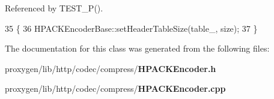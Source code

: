 Referenced by T\+E\+S\+T\+\_\+\+P().


\begin{DoxyCode}
35                                          \{
36     HPACKEncoderBase::setHeaderTableSize(table_, size);
37   \}
\end{DoxyCode}


The documentation for this class was generated from the following files\+:\begin{DoxyCompactItemize}
\item 
proxygen/lib/http/codec/compress/{\bf H\+P\+A\+C\+K\+Encoder.\+h}\item 
proxygen/lib/http/codec/compress/{\bf H\+P\+A\+C\+K\+Encoder.\+cpp}\end{DoxyCompactItemize}
